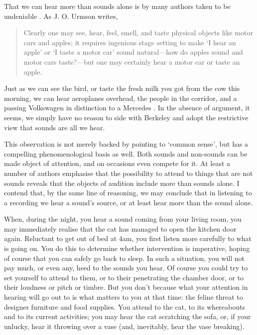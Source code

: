 \documentclass[sloppy, journal, git, bytitle, dodraft]{humapap}
\begin{document}
That we can hear more than sounds alone is by many authors taken to be undeniable \autocites{nudds2010aa, ocallaghan2011aa}. As J. O. Urmson writes, 
\begin{quote}
Clearly one may see, hear, feel, smell, and taste physical objects like motor cars and apples; it requires ingenious stage setting to make `I hear an apple' or `I taste a motor car' sound natural---how do apples sound and motor cars taste?---but one may certainly hear a motor car or taste an apple.\autocite[p. 117]{urmson1968aa}
\end{quote} Just as we can see the bird, or taste the fresh milk you got from the cow this morning, we can hear aeroplanes overhead, the people in the corridor, and a passing Volkswagen in distinction to a Mercedes \autocite{heidegger}. In the absence of argument, it seems, we simply have no reason to side with Berkeley and adopt the restrictive view that sounds are all we hear. 

This observation is not merely backed by pointing to `common sense', but has a compelling phenomenological basis as well. Both sounds and non-sounds can be made object of attention, and on occasions even compete for it. At least a number of authors emphasise that the possibility to attend to things that are not sounds reveals that the objects of audition include more than sounds alone. I contend that, by the same line of reasoning, we may conclude that in listening to a recording we hear a sound's source, or at least hear more than the sound alone. 
	
When, during the night, you hear a sound coming from your living room, you may immediately realise that the cat has managed to open the kitchen door again. Reluctant to get out of bed at 4am, you first listen more carefully to what is going on. You do this to determine whether intervention is imperative, hoping of course that you can safely go back to sleep. In such a situation, you will not pay much, or even any, heed to the sounds you hear. Of course you could try to set yourself to attend to them, or to their penetrating the chamber door, or to their loudness or pitch or timbre. But you don't because what your attention in hearing will go out to is what matters to you at that time: the feline threat to designer furniture and food supplies. You attend to the cat, to its whereabouts and to its current activities; you may hear the cat scratching the sofa, or, if your unlucky, hear it throwing over a vase (and, inevitably, hear the vase breaking).
\end{document}
